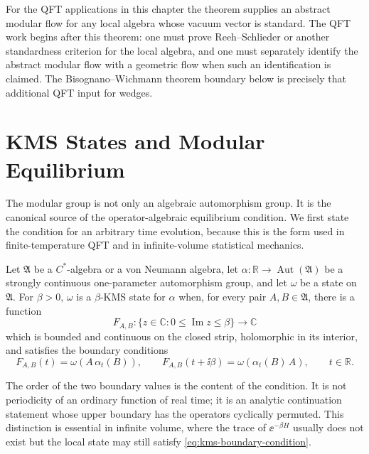 For the QFT applications in this chapter the theorem supplies an abstract
modular flow for any local algebra whose vacuum vector is standard.  The QFT
work begins after this theorem: one must prove Reeh--Schlieder or another
standardness criterion for the local algebra, and one must separately identify
the abstract modular flow with a geometric flow when such an identification is
claimed.  The Bisognano--Wichmann theorem boundary below is precisely that
additional QFT input for wedges.

\section{KMS States and Modular Equilibrium}
\label{sec:kms-states-modular-equilibrium}

The modular group is not only an algebraic automorphism group.  It is the
canonical source of the operator-algebraic equilibrium condition.  We first
state the condition for an arbitrary time evolution, because this is the form
used in finite-temperature QFT and in infinite-volume statistical mechanics.

\begin{definition}
\label{def:kms-state}
Let \(\mathfrak A\) be a \(C^*\)-algebra or a von Neumann algebra, let
\(\alpha:\mathbb R\to\operatorname{Aut}(\mathfrak A)\) be a strongly
continuous one-parameter automorphism group, and let \(\omega\) be a state on
\(\mathfrak A\).  For \(\beta>0\), \(\omega\) is a
\(\beta\)-KMS state for \(\alpha\) when, for every pair
\(A,B\in\mathfrak A\), there is a function
\[
  F_{A,B}:\{z\in\mathbb C:0\le \operatorname{Im}z\le\beta\}\to\mathbb C
\]
which is bounded and continuous on the closed strip, holomorphic in its
interior, and satisfies the boundary conditions
\begin{equation}
  F_{A,B}(t)=\omega\!\left(A\,\alpha_t(B)\right),
  \qquad
  F_{A,B}(t+\ii\beta)=
  \omega\!\left(\alpha_t(B)\,A\right),
  \qquad t\in\mathbb R .
  \label{eq:kms-boundary-condition}
\end{equation}
\end{definition}

The order of the two boundary values is the content of the condition.  It is
not periodicity of an ordinary function of real time; it is an analytic
continuation statement whose upper boundary has the operators cyclically
permuted.  This distinction is essential in infinite volume, where the trace
of \(\ee^{-\beta H}\) usually does not exist but the local state may still
satisfy \eqref{eq:kms-boundary-condition}.

